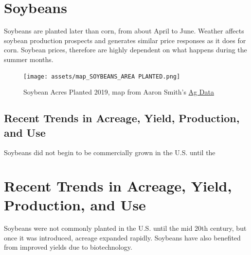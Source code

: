 \documentclass[
  letterpaper,
  DIV=11,
  numbers=noendperiod]{scrreprt}
\begin{document}
\hypertarget{soybeans}{%
\section{Soybeans}\label{soybeans}}

Soybeans are planted later than corn, from about April to June. Weather
affects soybean production prospects and generates similar price
responses as it does for corn. Soybean prices, therefore are highly
dependent on what happens during the summer months.

\begin{figure}

{\centering \texttt{[image: assets/map\_SOYBEANS\_AREA PLANTED.png]}

}

\caption{Soybean Acres Planted 2019, map from Aaron Smith's
\href{https://asmith.ucdavis.edu/data/us-crops}{Ag Data}}

\end{figure}

\hypertarget{recent-trends-in-acreage-yield-production-and-use}{%
\subsection{Recent Trends in Acreage, Yield, Production, and
Use}\label{recent-trends-in-acreage-yield-production-and-use}}

Soybeans did not begin to be commercially grown in the U.S. until the

\hypertarget{recent-trends-in-acreage-yield-production-and-use-1}{%
\section{Recent Trends in Acreage, Yield, Production, and
Use}\label{recent-trends-in-acreage-yield-production-and-use-1}}

Soybeans were not commonly planted in the U.S. until the mid 20th
century, but once it was introduced, acreage expanded rapidly. Soybeans
have also benefited from improved yields due to biotechnology.
\end{document}
